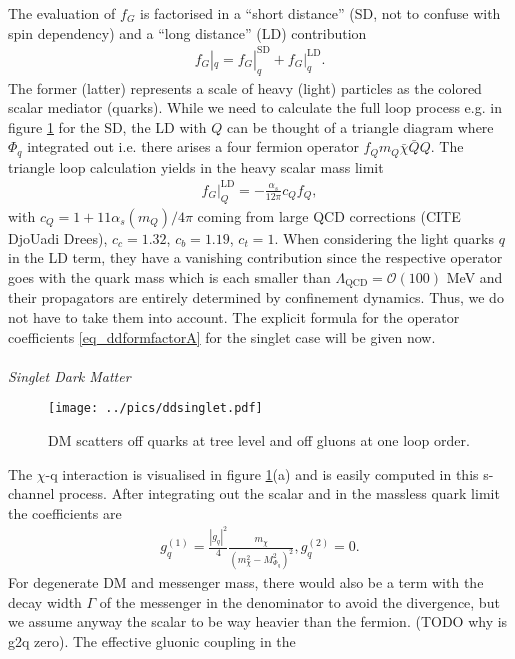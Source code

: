 \noindent The evaluation of $f_G$ is factorised in a ``short distance'' (SD, not to confuse with spin dependency) and a ``long distance'' (LD) 
contribution
\begin{align}
 f_G|_q = f_G|^\text{SD}_q + f_G|^\text{LD}_q. 
\end{align}
The former (latter) represents a scale of heavy (light) particles as the colored scalar mediator (quarks). While we need to calculate the full
loop process e.g. in figure \ref{pic_ddsinglet} for the SD, the LD with $Q$ can be thought of a triangle diagram where $\Phi_q$ integrated 
out i.e. there arises a four fermion operator $f_Q m_Q \bar \chi \bar Q Q$. The triangle loop calculation yields in the heavy scalar mass limit 
\begin{align}
 f_G|_Q^\text{LD} = -\frac{\alpha_s}{12\pi} c_Q f_Q,
 \label{eq_longdistance}
\end{align}
with $c_Q = 1+11\alpha_s(m_Q)/4\pi$ coming from large QCD corrections (CITE DjoUadi Drees), $c_c=1.32$, $c_b = 1.19$, $c_t = 1$.
When considering the light quarks $q$ in the LD term, they have a vanishing contribution since the respective operator goes with the quark mass
which is each smaller than $\Lambda_\text{QCD} = \mathcal{O}(100)$ MeV and their propagators are entirely determined by confinement dynamics. Thus,
we do not have to take them into account. The explicit formula for the operator coefficients \eqref{eq_ddformfactorA} for the singlet case 
will be given now.
\\ \\ \textit{Singlet Dark Matter}\\
\begin{figure}[t]
 \texttt{[image: ../pics/ddsinglet.pdf]}
 \caption{DM scatters off quarks at tree level and off gluons at one loop order.}
 \label{pic_ddsinglet}
\end{figure}
The $\chi$-q interaction is visualised in figure \ref{pic_ddsinglet}(a) and is easily computed in this s-channel process. After integrating out the 
scalar and in the massless quark limit the coefficients are
\begin{align}
 g_q^{(1)} = \frac{|g_q|^2 }{4} \frac{m_\chi}{\left(m_\chi^2 - M_{\Phi_q}^2\right)^2},
 g_q^{(2)} = 0.
\end{align}
For degenerate DM and messenger mass, there would also be a term with the decay width $\Gamma$ of the messenger in the denominator to avoid the 
divergence, but we assume anyway the scalar to be way heavier than the fermion. (TODO why is g2q zero). The effective gluonic coupling in the 
